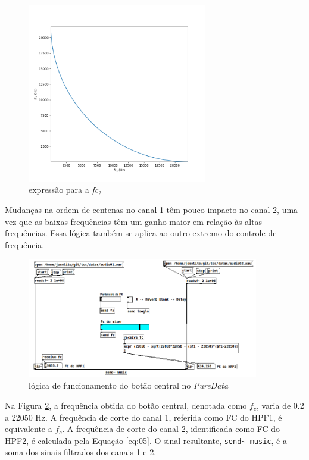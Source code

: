 \begin{figure}[h]
    \centering
    \includegraphics[width=0.7\textwidth]{figuras/fig45.png}
    \caption{expressão para a \textit{fc$_{2}$}}
    \label{fig45}
\end{figure}

Mudanças na ordem de centenas no canal 1 têm pouco impacto no canal 2, uma vez que as baixas frequências têm um ganho maior em relação às altas frequências. Essa lógica também se aplica ao outro extremo do controle de frequência.

\begin{figure}[h]
    \centering
    \includegraphics[width=0.9\textwidth]{figuras/fig44.png}
    \caption{lógica de funcionamento do botão central no \textit{PureData}}
    \label{fig44}
\end{figure}

Na Figura \ref{fig44}, a frequência obtida do botão central, denotada como \( f_c \), varia de 0.2 a 22050 Hz. A frequência de corte do canal 1, referida como FC do HPF1, é equivalente a \( f_c \). A frequência de corte do canal 2, identificada como FC do HPF2, é calculada pela Equação \ref{eq:05}. O sinal resultante, \texttt{send\textasciitilde\ music}, é a soma dos sinais filtrados dos canais 1 e 2.

